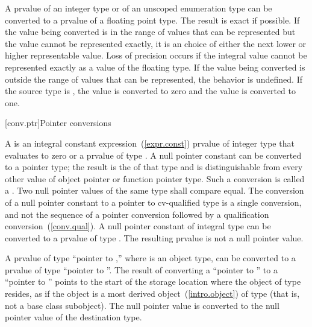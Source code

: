 \pnum
{}%
%
%
A prvalue of an integer type or of an unscoped enumeration type can be converted to
a prvalue of a floating point type. The result is exact if possible. If the value being
converted is in the range of values that can be represented but the value cannot be
represented exactly, it is an  choice of either the next lower or higher representable
value. \enternote Loss of precision occurs if the integral value cannot be represented
exactly as a value of the floating type. \exitnote If the value being converted is
outside the range of values that can be represented, the behavior is undefined. If the
source type is , the value  is converted to zero and the value
 is converted to one.

[conv.ptr]{Pointer conversions}

\pnum
{}%
%
%
%
A  is an integral constant
expression~(\ref{expr.const}) prvalue of integer type that evaluates to zero
or a prvalue of type . A null pointer constant can be
converted to a pointer type; the
result is the  of that type and is
distinguishable from every other value of
object pointer or function pointer
type.
Such a conversion is called a .
Two null pointer values of the same type shall compare
equal. The conversion of a null pointer constant to a pointer to
cv-qualified type is a single conversion, and not the sequence of a
pointer conversion followed by a qualification
conversion~(\ref{conv.qual}). A null pointer constant of integral type
can be converted to a prvalue of type .
\enternote The resulting prvalue is not a null pointer value. \exitnote

\pnum
A prvalue of type ``pointer to  ,'' where 
is an object type, can be converted to a prvalue of type ``pointer to
 ''. The result of converting a ``pointer to
 '' to a ``pointer to  ''
points to the start of the storage location where the object of type
 resides, as if the object is a most derived
object~(\ref{intro.object}) of type  (that is, not a base class
subobject). The null pointer value is converted to the null pointer
value of the destination type.

